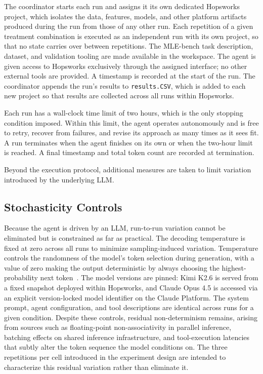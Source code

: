 \documentclass[
english,                 %
bibtex,                  %
includeExtraAbstracts, %
]{kththesis}
\numberwithin{listing}{chapter}
\begin{document}
The coordinator starts each run and assigns it its own dedicated Hopsworks project, which isolates the data, features, models, and other platform artifacts produced during the run from those of any other run. Each repetition of a given treatment combination is executed as an independent run with its own project, so that no state carries over between repetitions. The \gls{MLE}-bench task description, dataset, and validation tooling are made available in the workspace. The agent is given access to Hopsworks exclusively through the assigned interface; no other external tools are provided. A timestamp is recorded at the start of the run. The coordinator appends the run's results to \texttt{results.\gls{CSV}}, which is added to each new project so that results are collected across all runs within Hopsworks.

Each run has a wall-clock time limit of two hours, which is the only stopping condition imposed. Within this limit, the agent operates autonomously and is free to retry, recover from failures, and revise its approach as many times as it sees fit. A run terminates when the agent finishes on its own or when the two-hour limit is reached. A final timestamp and total token count are recorded at termination.

Beyond the execution protocol, additional measures are taken to limit variation introduced by the underlying \gls{LLM}.

\subsection{Stochasticity Controls}

Because the agent is driven by an \gls{LLM}, run-to-run variation cannot be eliminated but is constrained as far as practical. The decoding temperature is fixed at zero across all runs to minimize sampling-induced variation. Temperature controls the randomness of the model's token selection during generation, with a value of zero making the output deterministic by always choosing the highest-probability next token~\cite{ackley_learning_1985, holtzman_curious_2020}. The model versions are pinned: Kimi K2.6 is served from a fixed snapshot deployed within Hopsworks, and Claude Opus 4.5 is accessed via an explicit version-locked model identifier on the Claude Platform. The system prompt, agent configuration, and tool descriptions are identical across runs for a given condition. Despite these controls, residual non-determinism remains, arising from sources such as floating-point non-associativity in parallel inference, batching effects on shared inference infrastructure, and tool-execution latencies that subtly alter the token sequence the model conditions on. The three repetitions per cell introduced in the experiment design are intended to characterize this residual variation rather than eliminate it.
\end{document}
